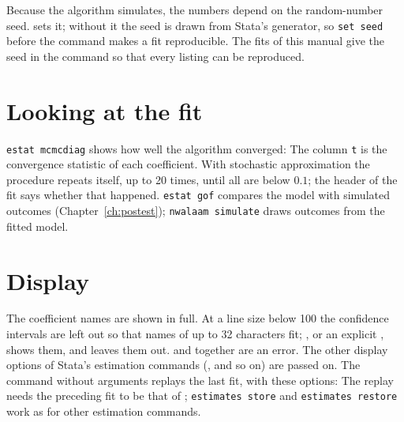 Because the algorithm simulates, the numbers depend on the random-number seed.  sets it; without it the seed is drawn from Stata's generator, so \texttt{set seed} before the command makes a fit reproducible. The fits of this manual give the seed in the command so that every listing can be reproduced.

\section{Looking at the fit}

\texttt{estat mcmcdiag} shows how well the algorithm converged:
The column \texttt{t} is the convergence statistic of each coefficient. With stochastic approximation the procedure repeats itself, up to 20 times, until all are below $0.1$; the header of the fit says whether that happened. \texttt{estat gof} compares the model with simulated outcomes (Chapter~\ref{ch:postest}); \texttt{nwalaam simulate} draws outcomes from the fitted model.

\section{Display}\label{sec:display}

The coefficient names are shown in full. At a line size below 100 the confidence intervals are left out so that names of up to 32 characters fit; , or an explicit , shows them, and  leaves them out.  and  together are an error. The other display options of Stata's estimation commands (,  and so on) are passed on. The command without arguments replays the last fit, with these options:
The replay needs the preceding fit to be that of \nwalaam{}; \texttt{estimates store} and \texttt{estimates restore} work as for other estimation commands.
